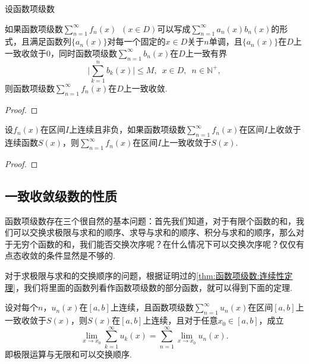     \begin{theorem}
        设函数项级数
    \end{theorem}
    \begin{theorem}[Dirichlet判别法]
        如果函数项级数\(\sum\limits_{n=1}^{\infty}f_n(x)\enspace (x\in D)\)可以写成\(\sum\limits_{n=1}^{\infty}a_n(x)b_n(x)\)的形式，且满足函数列\(\{a_n(x)\}\)对每一个固定的\(x\in D\)关于\(n\)单调，且\(\{a_n(x)\}\)在\(D\)上一致收敛于\(0\)，同时函数项级数\(\sum\limits_{n=1}^{\infty}b_n(x)\)在\(D\)上一致有界\[\lvert \sum_{k=1}^{n}b_k(x)\rvert\leq M,\enspace x\in D,\enspace n\in\mathbb{N}^{+},\]则函数项级数\(\sum\limits_{n=1}^{\infty}f_n(x)\)在\(D\)上一致收敛.
    \end{theorem}
    \begin{proof}
        
    \end{proof}

    \begin{theorem}
        设\(f_n(x)\)在区间\(I\)上连续且非负，如果函数项级数\(\sum\limits_{n=1}^{\infty}f_n(x)\)在区间\(I\)上收敛于连续函数\(S(x)\)，则\(\sum\limits_{n=1}^{\infty}f_n(x)\)在区间\(I\)上一致收敛于\(S(x)\).
    \end{theorem}
    \begin{proof}
        
    \end{proof}

\subsection{一致收敛级数的性质}

函数项级数存在三个很自然的基本问题：首先我们知道，对于有限个函数的和，我们可以交换求极限与求和的顺序、求导与求和的顺序、积分与求和的顺序，那么对于无穷个函数的和，我们能否交换次序呢？在什么情况下可以交换次序呢？仅仅有点态收敛的条件显然是不够的.

对于求极限与求和的交换顺序的问题，根据证明过的\autoref{thm:函数项级数:连续性定理}，我们将里面的函数列看作函数项级数的部分函数，就可以得到下面的定理.

\begin{theorem}[逐项求极限]
    设对每个\(n\)，\enspace \(u_n(x)\)在\([a,b]\)上连续，且函数项级数\(\sum\limits_{n=1}^{\infty}u_n(x)\)在区间\([a,b]\)上一致收敛于\(S(x)\)，则\(S(x)\)在\([a,b]\)上连续，且对于任意\(x_0\in[a,b]\)，成立\[\lim_{x\to x_0}\sum_{k=1}^{\infty}u_k(x) = \sum_{n=1}^{\infty}\lim_{x\to x_0}u_n(x).\]即极限运算与无限和可以交换顺序.
\end{theorem}

